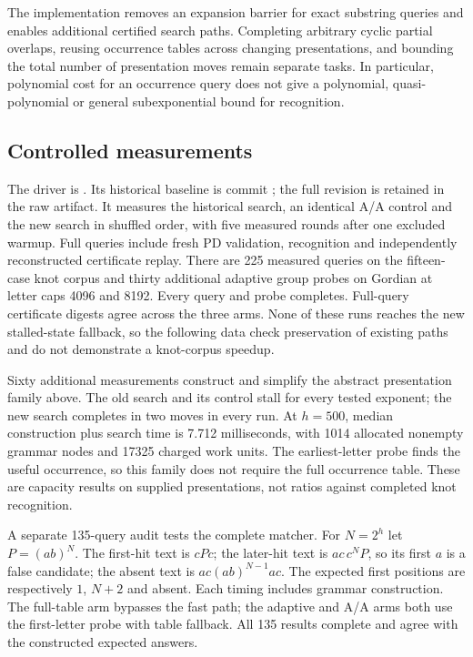 The implementation removes an expansion barrier for exact substring queries
and enables additional certified search paths. Completing arbitrary cyclic
partial overlaps, reusing occurrence tables across changing presentations,
and bounding the total number of presentation moves remain separate tasks.
In particular, polynomial cost for an occurrence query does not give a
polynomial, quasi-polynomial or general subexponential bound for recognition.

\subsection{Controlled measurements}

The driver is .
Its historical baseline is commit ;
the full revision is retained in the raw artifact. It measures the
historical search, an identical A/A control and the new search in shuffled
order, with five measured rounds after one excluded warmup. Full queries
include fresh PD validation, recognition and independently reconstructed
certificate replay. There are 225 measured queries on the fifteen-case knot
corpus and thirty additional adaptive group probes on Gordian at letter
caps 4096 and 8192. Every query and probe completes. Full-query certificate
digests agree across the three arms. None of these runs reaches the new
stalled-state fallback, so the following data check preservation of existing
paths and do not demonstrate a knot-corpus speedup.



Sixty additional measurements construct and simplify the abstract presentation
family above. The old search and its control stall for every tested exponent;
the new search completes in two moves in every run. At $h=500$, median
construction plus search time is 7.712 milliseconds, with 1014 allocated
nonempty grammar nodes and 17325 charged work units. The earliest-letter
probe finds the useful occurrence, so this family does not require the
full occurrence table. These are capacity results on supplied presentations,
not ratios against completed knot recognition.



A separate 135-query audit tests the complete matcher. For $N=2^h$ let
$P=(ab)^N$. The first-hit text is $cPc$; the later-hit text is
$ac\,c^N P$, so its first $a$ is a false candidate; the absent text is
$ac(ab)^{N-1}ac$. The expected first positions are respectively $1$, $N+2$
and absent. Each timing includes grammar construction. The full-table arm
bypasses the fast path; the adaptive and A/A arms both use the first-letter
probe with table fallback. All 135 results complete and agree with the
constructed expected answers.

